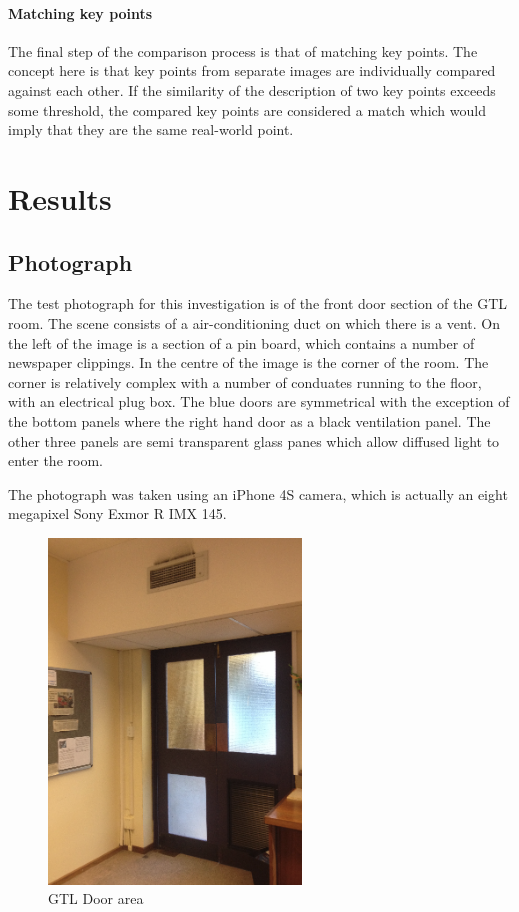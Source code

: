 \documentclass[11pt,a4paper]{report}
\begin{document}
				\subsubsection{Matching key points}
					The final step of the comparison process is that of matching key points. The concept here is that key points from separate images are individually compared against each other. If the similarity of the description of two key points exceeds some threshold, the compared key points are considered a match which would imply that they are the same real-world point.

\chapter{Results}
	\section{Photograph}
		The test photograph for this investigation is of the front door section of the GTL room. The scene consists of a air-conditioning duct on which there is a vent. On the left of the image is a section of a pin board, which contains a number of newspaper clippings. In the centre of the image is the corner of the room. The corner is relatively complex with a number of conduates running to the floor, with an electrical plug box. The blue doors are symmetrical with the exception of the bottom panels where the right hand door as a black ventilation panel. The other three panels are semi transparent glass panes which allow diffused light to enter the room.
		
		The photograph was taken using an iPhone 4S camera, which is actually an eight megapixel Sony Exmor R IMX 145.
		
		\begin{figure}[h!]
			\centering
			\includegraphics[width=0.6\textwidth]{gtl_door_area}
			\caption{GTL Door area}
		\end{figure}
		
\end{document}
